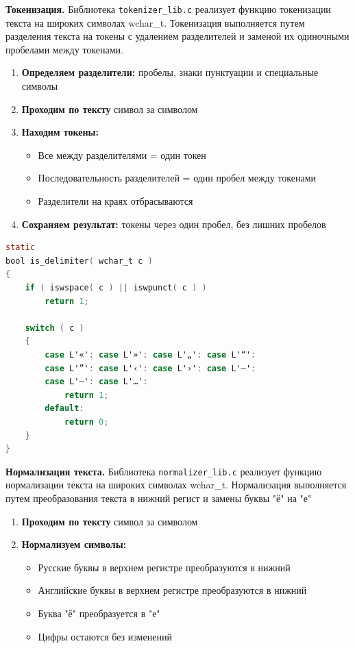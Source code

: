 \vspace{1 em}
\noindent\textbf{Токенизация.} Библиотека \texttt{tokenizer\_lib.c} реализует функцию токенизации текста на широких символах wchar\_t. Токенизация выполняется путем разделения текста на токены с удалением разделителей и заменой их одиночными пробелами между токенами.

\begin{enumerate}
    \item \textbf{Определяем разделители:} пробелы, знаки пунктуации и специальные символы
    
    \item \textbf{Проходим по тексту} символ за символом
    
    \item \textbf{Находим токены:}
    \begin{itemize}
        \item Все между разделителями = один токен
        \item Последовательность разделителей = один пробел между токенами
        \item Разделители на краях отбрасываются
    \end{itemize}
    
    \item \textbf{Сохраняем результат:} токены через один пробел, без лишних пробелов
\end{enumerate}

\begin{lstlisting}[language=C]
static
bool is_delimiter( wchar_t c )
{
    if ( iswspace( c ) || iswpunct( c ) )
        return 1;

    switch ( c )
    {
        case L'«': case L'»': case L'„': case L'“':
        case L'”': case L'‹': case L'›': case L'—':
        case L'–': case L'…':
            return 1;
        default:
            return 0;
    }
}
\end{lstlisting}

\vspace{2em}
\noindent\textbf{Нормализация текста.} Библиотека \texttt{normalizer\_lib.c} реализует функцию нормализации текста на широких символах wchar\_t. Нормализация выполняется путем преобразования текста в нижний регист и замены буквы "ё" на "е"

\begin{enumerate}
    
    \item \textbf{Проходим по тексту} символ за символом
    
    \item \textbf{Нормализуем символы:}
    \begin{itemize}
        \item Русские буквы в верхнем регистре преобразуются в нижний
        \item Английские буквы в верхнем регистре преобразуются в нижний
        \item Буква "ё"  преобразуется в "е"
        \item Цифры остаются без изменений
    \end{itemize}
\end{enumerate}

